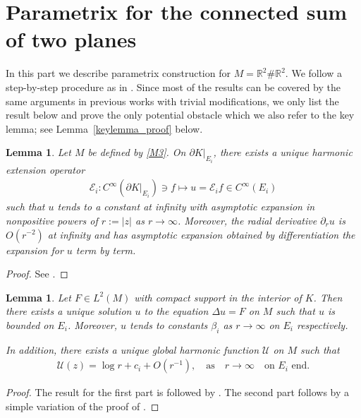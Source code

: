 \documentclass[12pt]{amsart}
\newtheorem{lemma}[theorem]{Lemma}
\begin{document}
\appendix

\section{Parametrix for the connected sum of two planes}\label{appendix}

In this part we describe parametrix construction for $M = \mathbb{R}^2 \# \mathbb{R}^2$. We follow a step-by-step procedure as in \cite{HNS}. Since most of the results can be covered by the same arguments in previous works with trivial modifications, we only list the result below and prove the only potential obstacle which we also refer to the key lemma; see Lemma~\ref{keylemma_proof} below. 


\begin{lemma}
Let $M$ be defined by \eqref{M3}. On $\partial K \big|_{E_i}$, there exists a unique harmonic extension operator
\begin{align*}
    \mathcal{E}_i : C^\infty(\partial K \big|_{E_i}) \ni f \mapsto u = \mathcal{E}_i f \in C^\infty(E_i)
\end{align*}
such that $u$ tends to a constant at infinity with asymptotic expansion in nonpositive powers of $r:=|z|$ as $r\to \infty$. Moreover, the radial derivative $\partial_r u$ is $O(r^{-2})$ at infinity and has asymptotic expansion obtained by differentiation the expansion for $u$ term by term.
\end{lemma}

\begin{proof}
See \cite[Lemma~2.2]{HNS}.
\end{proof}



\begin{lemma}\label{A2}
Let $F\in L^2(M)$ with compact support in the interior of $K$. Then there exists a unique solution $u$ to the equation $\Delta u = F$ on $M$ such that $u$ is bounded on $E_i$. Moreover, $u$ tends to constants $\beta_i$ as $r\to \infty$ on $E_i$ respectively.

In addition, there exists a unique global harmonic function $\mathcal{U}$ on $M$ such that
\begin{align*}
    \mathcal{U}(z) = \log{r} + c_i + O(r^{-1}), \quad \textrm{as} \quad r\to \infty \quad \textrm{on $E_i$ end}.
\end{align*}
\end{lemma}

\begin{proof}
The result for the first part is followed by \cite[Proposition~2.5, Lemma~2.6, Lemma~2.8]{HNS}. The second part follows by a simple variation of the proof of \cite[Lemma~2.8]{HNS}.
\end{proof}
\end{document}
